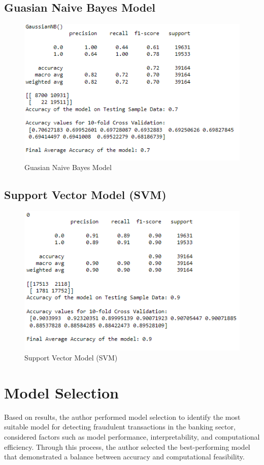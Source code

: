 \subsection{Guasian Naive Bayes Model}
\vspace{0.5cm}
\begin{figure}[h]
    \centering
    \includegraphics[width=0.6\linewidth]{image18}
    \caption{Guasian Naive Bayes Model}
    \label{fig:Guasian Naive Bayes Model}
\end{figure}
\subsection{Support Vector Model (SVM)}
\vspace{0.5cm}
\begin{figure}[h]
    \centering
    \includegraphics[width=0.6\linewidth]{image19}
    \caption{Support Vector Model (SVM)}
    \label{fig:Support Vector Model (SVM)}
\end{figure}
\section{Model Selection}
Based on results, the author performed model selection to identify the most 
suitable model for detecting fraudulent transactions in the banking sector, considered factors such as model 
performance, interpretability, and computational efficiency. Through this process, the author selected the best-performing 
model that demonstrated a balance between accuracy and computational feasibility.

